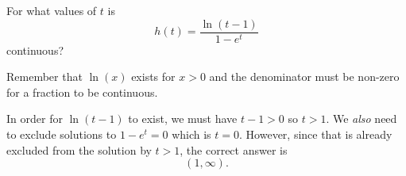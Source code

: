 \documentclass{ximera}
\author{Emma Smith Zbarsky}
\begin{document}
\begin{exercise}

For what values of $t$ is \[h(t) = \frac{\ln(t-1)}{1-e^t}\] continuous?


\begin{hint}
Remember that $\ln(x)$ exists for $x>0$ and the denominator must be
non-zero for a fraction to be continuous.
\end{hint}


\begin{hint}
In order for $\ln(t-1)$ to exist, we must have $t-1>0$ so $t>1$. We
\emph{also} need to exclude solutions to $1-e^t=0$ which is $t=0$.
However, since that is already excluded from the solution by $t>1$, the
correct answer is \[(1,\infty).\]
\end{hint}


\begin{multipleChoice}
\choice{$[1,\infty)$}
\choice{$\{0\}\bigcup [1,\infty)$}
\end{multipleChoice}

\end{exercise}
\end{document}
